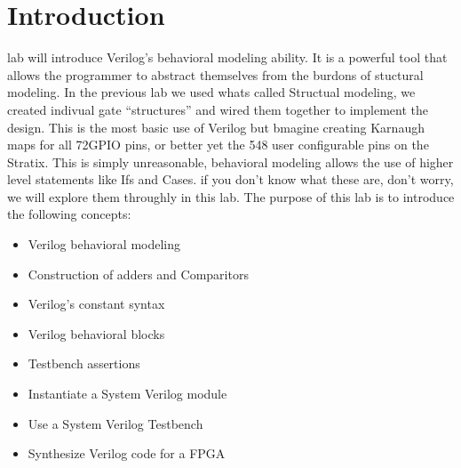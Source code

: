 
\newcommand{\TITLE}{Lab Three: Introduction to Verilog}
\newcommand{\KEYWORDS}{Logic Gates, Verilog, FPGA, Signaltap, Synthesis}
\newcommand{\ABSTRACT}{Two input logic gates are synthesized for the Altera Cyclone IV FPGA using the Quartus IDE. The logic gates are verified using a System Verilog testbench and Mentor's Modelsim HDL simulator}



\section{\bfseries Introduction}
   lab will introduce Verilog's behavioral modeling ability. It is a powerful tool that allows the programmer to abstract themselves from the burdons of stuctural modeling. In the previous lab we used whats called Structual modeling, we created indivual gate ``structures'' and wired them together to implement the design. This is the most basic use of Verilog but bmagine creating Karnaugh maps for all 72GPIO pins, or better yet the 548 user configurable pins on the Stratix\cite{Altera:StratixDeviceOverview}. This is simply unreasonable, behavioral modeling allows the use of higher level statements like Ifs and Cases. if you don't know what these are, don't worry, we will explore them throughly in this lab. The purpose of this lab is to introduce the following concepts:
  \begin{itemize}
    \item Verilog behavioral modeling
    \item Construction of adders and Comparitors
    \item Verilog's constant syntax
    \item Verilog behavioral blocks
    \item Testbench assertions
    \item Instantiate a System Verilog module
    \item Use a System Verilog Testbench
    \item Synthesize Verilog code for a FPGA
  \end{itemize}
  
